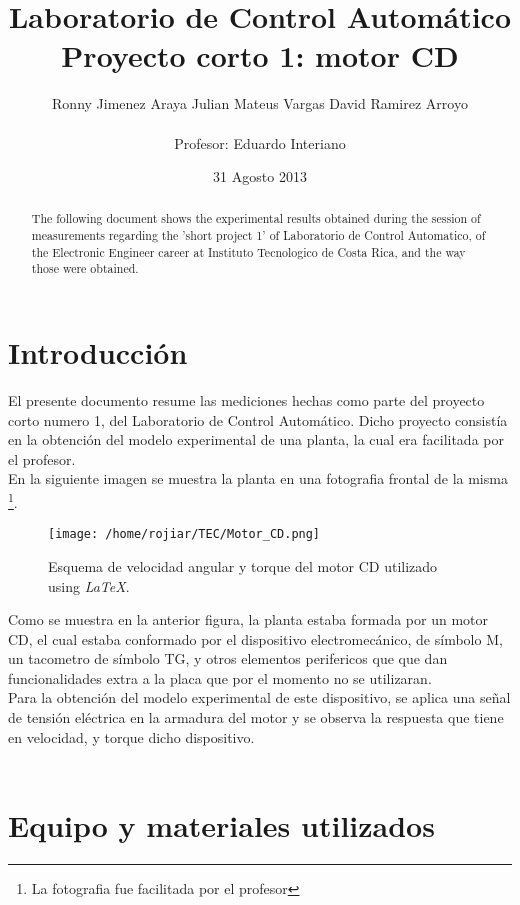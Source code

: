 \documentclass[a4paper,10pt,twocolumn]{article}
\title{\textbf{Laboratorio de Control Automático} \\ \textbf{Proyecto corto 1: motor CD}}
\author{Ronny Jimenez Araya \hspace*{1cm} Julian Mateus Vargas \hspace*{1cm} David Ramirez Arroyo\\
\\Profesor: Eduardo Interiano}
\date{31 Agosto 2013}
\begin{document}
\maketitle
\renewcommand{\figurename}{Figura}

\begin{abstract}

The following document shows the experimental results obtained during the session of measurements regarding the 'short project 1' 
of Laboratorio de Control Automatico, of the Electronic Engineer career at Instituto Tecnologico de Costa Rica, 
and the way those were obtained. 
\end{abstract}

\section{Introducción}

El presente documento resume las mediciones hechas como parte del proyecto corto numero 1, del Laboratorio de Control Automático.
Dicho proyecto consistía en la obtención del modelo experimental de una planta, la cual era facilitada por el profesor.\\

En la siguiente imagen se muestra la planta en una fotografia frontal de la misma \footnote{La fotografia fue facilitada por el profesor}.

\begin{figure}[h!]
\centering
\texttt{[image: /home/rojiar/TEC/Motor\_CD.png]}
\caption{Esquema de velocidad angular y torque del motor CD utilizado using \textit{\LaTeX}.}
\label{Esquema de velocidad angular y torque del motor CD utilizado}
\end{figure}

Como se muestra en la anterior figura, la planta estaba formada por un motor CD, el cual estaba conformado por el dispositivo electromecánico,
de símbolo M, un tacometro de símbolo TG, y otros elementos perifericos que que dan funcionalidades extra a la placa que por el momento no se 
utilizaran.\\

Para la obtención del modelo experimental de este dispositivo, se aplica una señal de tensión eléctrica en la armadura del motor y se observa la 
respuesta que tiene en velocidad, y torque dicho dispositivo. \\ \\


\section{Equipo y materiales utilizados}
\end{document}
